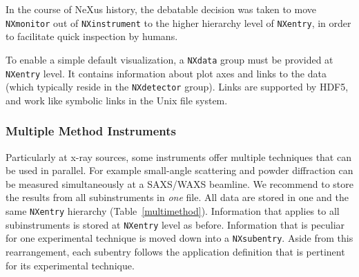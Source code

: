 \documentclass[%
 aip,
rsi,
 amsmath,amssymb,
 reprint,%
]{revtex4-1}
\begin{document}
In the course of NeXus history,
the debatable decision was taken to move \texttt{NXmonitor}
out of \texttt{NXinstrument} to the higher hierarchy level of \texttt{NXentry},
in order to facilitate quick inspection by humans.

To enable a simple default visualization,
a \texttt{NXdata} group must be provided at \texttt{NXentry} level.
It contains information about plot axes and links to the data
(which typically reside in the \texttt{NXdetector} group).
Links are supported by HDF5,
and work like symbolic links in the Unix file system.

\subsubsection{Multiple Method Instruments}

Particularly at x-ray sources,
some instruments offer multiple techniques that can be used in parallel.
For example small-angle scattering and powder diffraction 
can be measured simultaneously at a SAXS/WAXS beamline.
We recommend to store the results from all subinstruments in \emph{one} file.
All data are stored in one and the same \texttt{NXentry} hierarchy
(Table~\ref{multimethod}).
Information that applies to all subinstruments is stored
at \texttt{NXentry} level as before.
Information that is peculiar for one experimental technique
is moved down into a \texttt{NXsubentry}.
Aside from this rearrangement,
each subentry follows the application definition that is pertinent
for its experimental technique.
\end{document}
